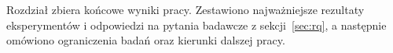\label{chap:conclusions}

Rozdział zbiera końcowe wyniki pracy. Zestawiono najważniejsze rezultaty eksperymentów i odpowiedzi na pytania badawcze z sekcji~\ref{sec:rq}, a następnie omówiono ograniczenia badań oraz kierunki dalszej pracy.



